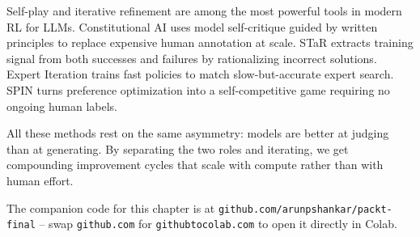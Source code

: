 \begin{chapterenv}
Self-play and iterative refinement are among the most powerful tools in modern RL for LLMs. Constitutional AI uses model self-critique guided by written principles to replace expensive human annotation at scale. STaR extracts training signal from both successes and failures by rationalizing incorrect solutions. Expert Iteration trains fast policies to match slow-but-accurate expert search. SPIN turns preference optimization into a self-competitive game requiring no ongoing human labels.

All these methods rest on the same asymmetry: models are better at judging than at generating. By separating the two roles and iterating, we get compounding improvement cycles that scale with compute rather than with human effort.


The companion code for this chapter is at \texttt{github.com/arunpshankar/packt-final} -- swap \texttt{github.com} for \texttt{githubtocolab.com} to open it directly in Colab.

\end{chapterenv}
